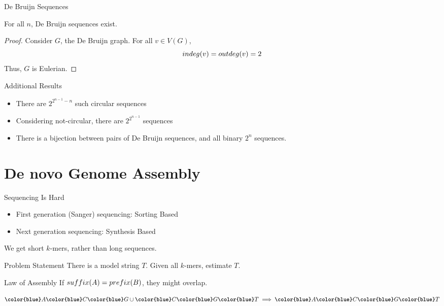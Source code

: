\documentclass[aspectratio=169, handout]{beamer}
\renewcommand{\Sym}[1]{\textbf{\texttt{\color{blue}\ensuremath{#1}}}}
\newcommand{\TA}{\Sym{A}}
\newcommand{\TT}{\Sym{T}}
\newcommand{\TC}{\Sym{C}}
\newcommand{\TG}{\Sym{G}}
\begin{document}
\begin{frame}{De Bruijn Sequences}
	\begin{claim}
		For all $n$, De Bruijn sequences exist.
	\end{claim}

	\begin{proof}
		Consider $G$, the De Bruijn graph.
		\pause
		For all $v \in V(G)$,
		$$
			\emph{indeg}(v) = \emph{outdeg}(v) = 2
		$$
		\pause
		Thus, $G$ is Eulerian.
	\end{proof}
\end{frame}

\begin{frame}{Additional Results}
	\begin{itemize}\onslide<+->
		\item There are $2^{2^{n-1} - n}$ such circular sequences \onslide<+->
		\item Considering not-circular, there are $2^{2^{n-1}}$ sequences \onslide<+->
		\item There is a bijection between pairs of De Bruijn sequences, and all binary $2^n$ sequences.
	\end{itemize}
\end{frame}

\section{De novo Genome Assembly}
\frame{\sectionpage}

\begin{frame}{Sequencing Is Hard}
	\begin{itemize}\onslide<+->
		\item First generation (Sanger) sequencing: Sorting Based \onslide<+->
		\item Next generation sequencing: Synthesis Based \onslide<+->
	\end{itemize}

	We get short $k$-mers, rather than long sequences.
\end{frame}

\begin{frame}{Problem Statement}
	There is a model string $T$.
	Given all $k$-mers, estimate $T$.
\end{frame}

\begin{frame}{Law of Assembly}
	If $\emph{suffix}(A) = \emph{prefix}(B)$, they might overlap.

	\pause
	$$
		\TA \TC \TG \cup \TC \TG \TT \implies \TA \TC \TG \TT
	$$
\end{frame}
\end{document}
